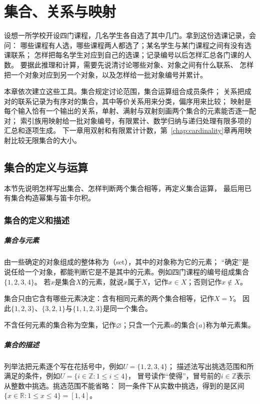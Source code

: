 \chapter{集合、关系与映射}
\label{chap:sets-functions-and-proofs}
\label{chap:sets-relations-maps}

设想一所学校开设四门课程，几名学生各自选了其中几门。拿到这份选课记录，会问：
哪些课程有人选，哪些课程两人都选了；某名学生与某门课程之间有没有选课联系；
怎样把每名学生对应到自己的选课；记录编号以后怎样汇总各门课的人数。
要据此推理和计算，需要先说清讨论哪些对象、对象之间有什么联系、
怎样把一个对象对应到另一个对象，以及怎样给一批对象编号并累计。

本章依次建立这些工具。集合规定讨论范围，集合运算组合成员条件；
关系把成对的联系记录为有序对的集合，其中等价关系用来分类，偏序用来比较；
映射是每个输入恰有一个输出的关系，单射、满射与双射刻画两个集合的元素能否逐一配对；
索引族用映射给一批对象编号，有限累计、数学归纳与递归处理有限多项的汇总和逐项生成。
下一章用双射和有限累计计数，第~\ref{chap:cardinality}章再用映射比较无限集合的大小。

\section{集合的定义与运算}
\label{sec:prelim-sets-relations-functions}

本节先说明怎样写出集合、怎样判断两个集合相等，再定义集合运算，
最后用已有集合构造幂集与笛卡尔积。

\subsection{集合的定义和描述}
\label{sec:prelim-set-definition}

\paragraph{集合与元素}
由一些确定的对象组成的整体称为（set），其中的对象称为它的元素；
“确定”是说任给一个对象，都能判断它是不是其中的元素。例如四门课程的编号组成集合$\{1,2,3,4\}$。
若$x$是集合$X$的元素，就说$x$属于$X$，记作$x\in X$；否则记作$x\notin X$。

集合只由它含有哪些元素决定：含有相同元素的两个集合相等，记作$X=Y$。
因此$\{1,2,3\}$、$\{3,2,1\}$与$\{1,1,2,3\}$是同一个集合。

不含任何元素的集合称为空集，记作$\varnothing$；只含一个元素$a$的集合$\{a\}$称为单元素集。

\paragraph{集合的描述}
列举法把元素逐个写在花括号中，例如$U=\{1,2,3,4\}$；
描述法写出挑选范围和所满足的条件，例如$U=\{i\in\mathbb Z:1\leq i\leq4\}$，
冒号读作“使得”，冒号前的$i\in\mathbb Z$表示从整数中挑选。挑选范围不能省略：
同一条件下从实数中挑选，得到的是区间$\{x\in\mathbb R:1\leq x\leq4\}=[1,4]$。

